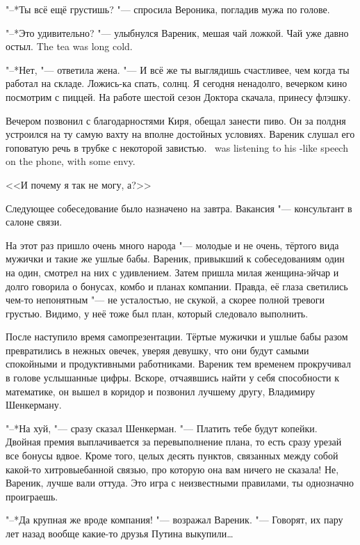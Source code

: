 "--*Ты всё ещё грустишь? "--- спросила Вероника, погладив мужа по голове.

"--*Это удивительно? "--- улыбнулся Вареник, мешая чай ложкой.
{Чай уже давно остыл.}
{The tea was long cold.}

"--*Нет, "--- ответила жена.
"--- И всё же ты выглядишь счастливее, чем когда ты работал на складе.
Ложись-ка спать, солнц.
Я сегодня ненадолго, вечерком кино посмотрим с пиццей.
На работе шестой сезон Доктора скачала, принесу флэшку.

Вечером позвонил с благодарностями Киря, обещал занести пиво.
Он за полдня устроился на ту самую вахту на вполне достойных условиях.
{Вареник слушал его гоповатую речь в трубке с некоторой завистью.}
{\Varenik\ was listening to his \gopnik-like speech on the phone, with some envy.}

<<И почему я так не могу, а?>>

\asterism

\label{Tue_2012_04_10}

Следующее собеседование было назначено на завтра.
Вакансия "--- консультант в салоне связи.

На этот раз пришло очень много народа "--- молодые и не очень, тёртого вида мужички и такие же ушлые бабы.
Вареник, привыкший к собеседованиям один на один, смотрел на них с удивлением.
Затем пришла милая женщина-эйчар и долго говорила о бонусах, комбо и планах компании.
Правда, её глаза светились чем-то непонятным "--- не усталостью, не скукой, а скорее полной тревоги грустью.
Видимо, у неё тоже был план, который следовало выполнить.

После наступило время самопрезентации.
Тёртые мужички и ушлые бабы разом превратились в нежных овечек, уверяя девушку, что они будут самыми спокойными и продуктивными работниками.
Вареник тем временем прокручивал в голове услышанные цифры.
Вскоре, отчаявшись найти у себя способности к математике, он вышел в коридор и позвонил лучшему другу, Владимиру Шенкерману.

"--*На хуй, "--- сразу сказал Шенкерман.
"--- Платить тебе будут копейки.
Двойная премия выплачивается за перевыполнение плана, то есть сразу урезай все бонусы вдвое.
Кроме того, целых десять пунктов, связанных между собой какой-то хитровыебанной связью, про которую она вам ничего не сказала!
Не, Вареник, лучше вали оттуда.
Это игра с неизвестными правилами, ты однозначно проиграешь.

"--*Да крупная же вроде компания! "--- возражал Вареник.
"--- Говорят, их пару лет назад вообще какие-то друзья Путина выкупили\dots{}

